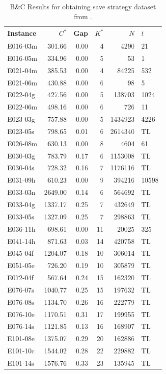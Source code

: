 \begin{table}
    \centering
    \begin{tabular}{lrrrrl}
        \toprule
        Instance & $C^*$   & Gap  & $K^*$ & $N$     & $t$   \\
        \midrule
        E016-03m & 301.66  & 0.00 & 4     & 4290    & 21    \\
        E016-05m & 334.96  & 0.00 & 5     & 53      & 1     \\
        E021-04m & 385.53  & 0.00 & 4     & 84225   & 532   \\
        E021-06m & 430.88  & 0.00 & 6     & 98      & 5     \\
        E022-04g & 427.56  & 0.00 & 5     & 138703  & 1024  \\
        E022-06m & 498.16  & 0.00 & 6     & 726     & 11    \\
        E023-03g & 757.88  & 0.00 & 5     & 1434923 & 4226  \\
        E023-05s & 798.65  & 0.01 & 6     & 2614340 & TL    \\
        E026-08m & 630.13  & 0.00 & 8     & 4604    & 61    \\
        E030-03g & 783.79  & 0.17 & 6     & 1153008 & TL    \\
        E030-04s & 728.32  & 0.16 & 7     & 1176116 & TL    \\
        E031-09h & 610.23  & 0.00 & 9     & 394216  & 10598 \\
        E033-03n & 2649.00 & 0.14 & 6     & 564692  & TL    \\
        E033-04g & 1337.17 & 0.25 & 7     & 432649  & TL    \\
        E033-05s & 1327.09 & 0.25 & 7     & 298863  & TL    \\
        E036-11h & 698.61  & 0.00 & 11    & 20025   & 325   \\
        E041-14h & 871.63  & 0.03 & 14    & 420758  & TL    \\
        E045-04f & 1204.07 & 0.18 & 10    & 306014  & TL    \\
        E051-05e & 726.20  & 0.19 & 10    & 305879  & TL    \\
        E072-04f & 567.64  & 0.24 & 15    & 162320  & TL    \\
        E076-07s & 1040.77 & 0.25 & 15    & 197632  & TL    \\
        E076-08s & 1134.70 & 0.26 & 16    & 222779  & TL    \\
        E076-10e & 1170.51 & 0.31 & 17    & 199955  & TL    \\
        E076-14s & 1121.85 & 0.13 & 16    & 168907  & TL    \\
        E101-08e & 1375.07 & 0.29 & 20    & 162886  & TL    \\
        E101-10c & 1544.02 & 0.28 & 22    & 229882  & TL    \\
        E101-14s & 1576.76 & 0.33 & 23    & 135945  & TL    \\
        \bottomrule
    \end{tabular}
    \caption{B\&C Results for obtaining save strategy dataset from \gendreauDataSet.}
    \label{tab:bc_results_gendreau}
\end{table}

